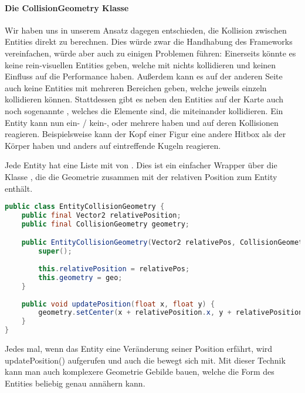 \paragraph{Die CollisionGeometry Klasse}

Wir haben uns in unserem Ansatz dagegen entschieden, die Kollision zwischen Entities direkt zu berechnen. Dies würde zwar die Handhabung des Frameworks vereinfachen, würde aber auch zu einigen Problemen führen: Einerseits könnte es keine rein-visuellen Entities geben, welche mit nichts kollidieren und keinen Einfluss auf die Performance haben. Außerdem kann es auf der anderen Seite auch keine Entities mit mehreren Bereichen geben, welche jeweils einzeln kollidieren können. 
Stattdessen gibt es neben den Entities auf der Karte auch noch sogenannte , welches die Elemente sind, die miteinander kollidieren.
Ein Entity kann nun ein- / kein-, oder mehrere  haben und auf deren Kollisionen reagieren. Beispielsweise kann der Kopf einer Figur eine andere Hitbox als der Körper haben und anders auf eintreffende Kugeln reagieren.

Jede Entity hat eine Liste mit von . Dies ist ein einfacher Wrapper über die Klasse , die die Geometrie zusammen mit der relativen Position zum Entity enthält.

\begin{lstlisting}[caption=Die Klasse EntityCollisionGeometry, title=\hspace{0 pt}, language=java]
public class EntityCollisionGeometry {
	public final Vector2 relativePosition;
	public final CollisionGeometry geometry;

	public EntityCollisionGeometry(Vector2 relativePos, CollisionGeometry geo) {
		super();
		
		this.relativePosition = relativePos;
		this.geometry = geo;
	}
	
	public void updatePosition(float x, float y) {
		geometry.setCenter(x + relativePosition.x, y + relativePosition.y);
	}
}
\end{lstlisting}

Jedes mal, wenn das Entity eine Veränderung seiner Position erfährt, wird updatePosition() aufgerufen und auch die  bewegt sich mit.
Mit dieser Technik kann man auch komplexere Geometrie Gebilde bauen, welche die Form des Entities beliebig genau annähern kann. \cite[S 500]{DGIJ}


